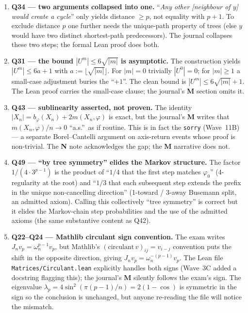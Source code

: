\documentclass[11pt,a4paper]{article}
\newcommand{\cmd}[1]{\texttt{\small #1}}
\newcommand{\lmod}[1]{\texttt{\small #1}}
\theoremstyle{plain}
\theoremstyle{definition}
\begin{document}
\begin{enumerate}[leftmargin=1.5em, label=\textbf{E\arabic*.}]
\item \textbf{Q34 --- two arguments collapsed into one.}
``\emph{Any other [neighbour of $y$] would create a cycle}'' only
yields distance $\geq p$, not equality with $p+1$. To exclude
distance $p$ one further needs the unique-path property of trees
(else $y$ would have two distinct shortest-path predecessors).
The journal collapses these two steps; the formal Lean proof
does both.

\item \textbf{Q31 --- the bound $|U^m| \leq 6\sqrt{|m|}$ is
asymptotic.} The construction yields $|U^m| \leq 6 a + 1$ with
$a := \lfloor\sqrt{|m|}\rfloor$. For $|m| = 0$ trivially
$|U^0| = 0$; for $|m| \geq 1$ a small-case adjustment buries the
``$+1$''. The clean bound is $|U^m| \leq 6\sqrt{|m|} + 1$.
The Lean proof carries the small-case clause; the journal's
\textbf{M} section omits it.

\item \textbf{Q43 --- sublinearity asserted, not proven.} The
identity $|X_n| = b_\varphi(X_n) + 2 m(X_n, \varphi)$ is exact, but
the journal's \textbf{M} writes that $m(X_n, \varphi)/n \to 0$
``a.s.''\ as if routine. This is in fact the
 \cmd{sorry} (Wave~11B) ---
a separate Borel--Cantelli argument on axis-return events whose
proof is non-trivial. The \textbf{N} note acknowledges the gap;
the \textbf{M} narrative does not.

\item \textbf{Q49 --- ``by tree symmetry'' elides the Markov
structure.} The factor $1/(4 \cdot 3^{p-1})$ is the product of
``$1/4$ that the first step matches $\varphi_0$'' (4-regularity at
the root) and ``$1/3$ that each subsequent step extends the prefix
in the unique non-cancelling direction'' (1-toward / 3-away
Busemann split, an admitted axiom). Calling this collectively
``tree symmetry'' is correct but it elides the Markov-chain step
probabilities and the use of the admitted axioms (the same
substantive content as Q42).

\item \textbf{Q22--Q24 --- Mathlib circulant sign convention.}
The exam writes $J_n v_p = \omega_n^{p-1} v_p$, but Mathlib's
$(\text{circulant}\,v)_{ij} = v_{i-j}$ convention puts the shift
in the opposite direction, giving $J_n v_p = \omega_n^{-(p-1)} v_p$.
The Lean file \lmod{Matrices/Circulant.lean} explicitly handles
both signs (Wave~3C added a docstring flagging this); the journal's
\textbf{M} silently follows the exam's sign. The eigenvalue
$\lambda_p = 4\sin^2(\pi(p-1)/n) = 2(1 - \cos)$ is symmetric in
the sign so the conclusion is unchanged, but anyone re-reading
the file will notice the mismatch.

\end{enumerate}
\end{document}
